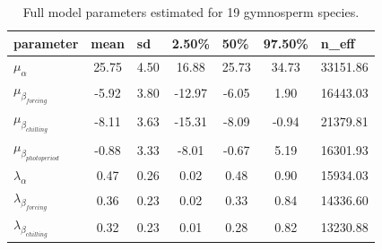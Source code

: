 \documentclass{article}\usepackage[]{graphicx}\usepackage[]{color}
\begin{document}
\begin{table}[H]
 \begin{center}
\caption{Full model parameters estimated for 19 gymnosperm species.}
\begin{tabular}{@{}lcccccc@{}}
\toprule
\textbf{parameter}             & \multicolumn{1}{l}{\textbf{mean}} & \multicolumn{1}{l}{\textbf{sd}} & \multicolumn{1}{l}{\textbf{2.50\%}} & \multicolumn{1}{l}{\textbf{50\%}} & \multicolumn{1}{l}{\textbf{97.50\%}} & \multicolumn{1}{l}{\textbf{n\_eff}} \\ \midrule
$\mu_\alpha$                   & 25.75                             & 4.50                            & 16.88                               & 25.73                             & 34.73                                & 33151.86                            \\
$\mu_\beta_{forcing}$          & -5.92                             & 3.80                            & -12.97                              & -6.05                             & 1.90                                 & 16443.03                            \\
$\mu_\beta_{chilling}$         & -8.11                             & 3.63                            & -15.31                              & -8.09                             & -0.94                                & 21379.81                            \\
$\mu_\beta_{photoperiod}$      & -0.88                             & 3.33                            & -8.01                               & -0.67                             & 5.19                                 & 16301.93                            \\
$\lambda_\alpha$               & 0.47                              & 0.26                            & 0.02                                & 0.48                              & 0.90                                 & 15934.03                            \\
$\lambda_\beta_{forcing}$      & 0.36                              & 0.23                            & 0.02                                & 0.33                              & 0.84                                 & 14336.60                            \\
$\lambda_\beta_{chilling}$     & 0.32                              & 0.23                            & 0.01                                & 0.28                              & 0.82                                 & 13230.88                            \\

\end{tabular}
\end{center}
\end{table}
\end{document}
